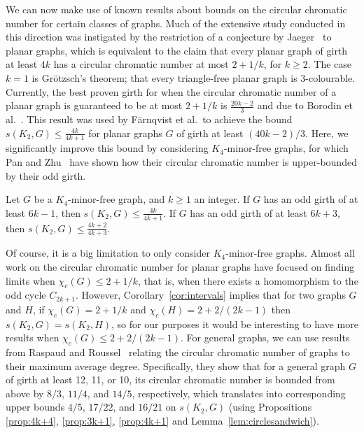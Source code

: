 \documentclass[11pt,a4paper]{article}
\begin{document}
We can now make use of known results about bounds on the circular
chromatic number for certain classes of graphs. Much of the extensive
study conducted in this direction was instigated by the restriction of a
conjecture by Jaeger~\cite{jaeger:88} to planar graphs, which is
equivalent to the claim that every planar graph of girth at least $4k$
has a circular chromatic number at most $2 + 1/k$, for $k \geq 2$. The
case $k=1$ is Gr\"{o}tzsch's theorem; that every triangle-free planar
graph is 3-colourable. Currently, the best proven girth for when the
circular chromatic number of a planar graph is guaranteed to be at most
$2+1/k$ is $\frac{20k-2}{3}$ and due to Borodin et
al.~\cite{Borodin:etal:jctb2004}. This result was used by F\"{a}rnqvist
et al.\ to achieve the bound $s(K_2,G) \leq \frac{4k}{4k+1}$ for planar
graphs $G$ of girth at least $(40k-2)/3$. Here, we significantly improve
this bound by considering $K_4$-minor-free graphs, for which Pan and
Zhu~\cite{pan:zhu:02} have shown how their circular chromatic number is
upper-bounded by their odd girth.
\begin{proposition} \label{thmI}
Let $G$ be a $K_4$-minor-free graph, and $ k \geq 1$ an integer. If $G$
has an odd girth of at least $6k-1$, then $s(K_2,G) \leq
\frac{4k}{4k+1}$. If $G$ has an odd girth of at least $6k+3$, then
$s(K_2,G) \leq \frac{4k+2}{4k+3}$.
\end{proposition}


Of course, it is a big limitation to only consider $K_4$-minor-free
graphs. Almost all work on the circular chromatic number for planar
graphs have focused on finding limits when $\chi_c(G) \leq 2 + 1/k$,
that is, when there exists a homomorphism to the odd cycle $C_{2k+1}$.
However, Corollary~\ref{cor:intervals} implies that for two graphs
$G$ and $H$, if $\chi_c(G) = 2 + 1/k$ and $\chi_c(H) = 2+ 2/(2k-1)$ then
$s(K_2,G)=s(K_2,H)$, so for our purposes it would be interesting to have
more results when $\chi_c(G) \leq 2+ 2/(2k-1)$. 
For general graphs, we can use results from Raspaud and
Roussel~\cite{raspaud:rousell:07} relating the circular chromatic number
of graphs to their maximum average degree. Specifically, they show that
for a general graph $G$ of girth at least 12, 11, or 10, its circular
chromatic number is bounded from above by $8/3$, $11/4$, and $14/5$,
respectively, which translates into corresponding upper bounds $4/5$,
$17/22$, and $16/21$ on $s(K_2,G)$ (using Propositions \ref{prop:4k+4},
\ref{prop:3k+1}, \ref{prop:4k+1} and Lemma~\ref{lem:circlesandwich}).
\end{document}
